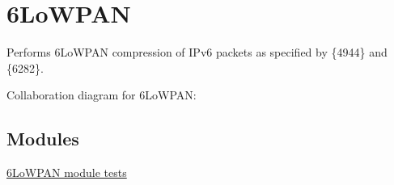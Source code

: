\hypertarget{group__sixlowpan}{}\section{6\+Lo\+W\+P\+AN}
\label{group__sixlowpan}


Performs 6\+Lo\+W\+P\+AN compression of I\+Pv6 packets as specified by \{4944\} and \{6282\}.  


Collaboration diagram for 6\+Lo\+W\+P\+AN\+:
\subsection*{Modules}
\begin{DoxyCompactItemize}
\item 
\hyperlink{group__sixlowpan-test}{6\+Lo\+W\+P\+A\+N module tests}
\end{DoxyCompactItemize}
